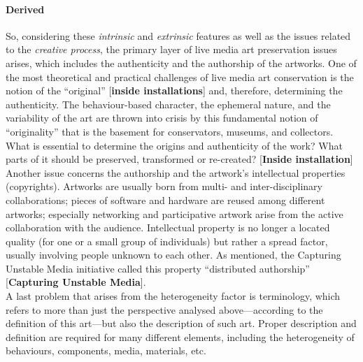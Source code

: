 \paragraph*{Derived}
So, considering these \textit{intrinsic} and \textit{extrinsic} features as well as the issues related to the \textit{creative process}, the primary layer of live media art preservation issues arises, which includes the authenticity and the authorship of the artworks.
One of the most theoretical and practical challenges of live media art conservation is the notion of the ``original'' [\textbf{inside installations}] and, therefore, determining the authenticity. The behaviour-based character, the ephemeral nature, and the variability of the art are thrown into crisis by this fundamental notion of ``originality'' that is the basement for conservators, museums, and collectors. What is essential to determine the origins and authenticity of the work? What parts of it should be preserved, transformed or re-created? [\textbf{Inside installation}]\\ 
Another issue concerns the authorship and the artwork's intellectual properties (copyrights). Artworks are usually born from multi- and inter-disciplinary collaborations; pieces of software and hardware are reused among different artworks; especially networking and participative artwork arise from the active collaboration with the audience. Intellectual property is no longer a located quality (for one or a small group of individuals) but rather a spread factor, usually involving people unknown to each other. As mentioned, the Capturing Unstable Media initiative called this property ``distributed authorship'' [\textbf{Capturing Unstable Media}].\\
A last problem that arises from the heterogeneity factor is terminology, which refers to more than just the perspective analysed above—according to the definition of this art—but also the description of such art. Proper description and definition are required for many different elements, including the heterogeneity of behaviours, components, media, materials, etc. 

